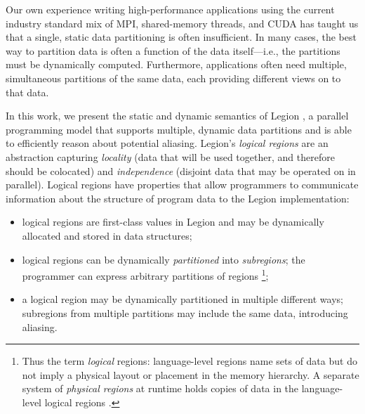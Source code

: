 Our own experience writing high-performance applications
using the current industry standard mix of MPI, shared-memory
threads, and CUDA has taught us that a
single, static data partitioning is often insufficient.  In many cases, the
best way to partition data is often a function of the data
itself---i.e., the partitions must be dynamically computed.
Furthermore, applications often need multiple, simultaneous partitions of
the same data, each providing different views on to that data.  

In this work, we present the static and dynamic semantics of Legion \cite{Legion12},
a parallel programming model that supports multiple, dynamic data partitions and is
able to efficiently reason about potential aliasing.
Legion's {\em logical regions} are an abstraction capturing {\em locality} 
(data that will be used together, and therefore should be colocated) 
and {\em independence} (disjoint data that may be operated on in parallel).  
Logical regions have properties that allow programmers to communicate information
about the structure of program data to the Legion implementation:
\begin{itemize}
\item  logical regions are first-class values in Legion
and may be dynamically allocated and stored in data structures;

\item logical regions can be dynamically {\em partitioned} into {\em subregions}; 
the programmer can express arbitrary partitions of regions
\footnote{Thus
  the term {\em logical} regions: language-level regions
  name sets of data but do not imply a physical layout or placement in
  the memory hierarchy. A separate system of {\em physical regions} at
  runtime holds copies of data in the language-level logical regions
  \cite{Legion12}.};

\item  a logical region may be dynamically partitioned in multiple different ways;
subregions from multiple partitions may include the same data, introducing aliasing.

\end{itemize}


